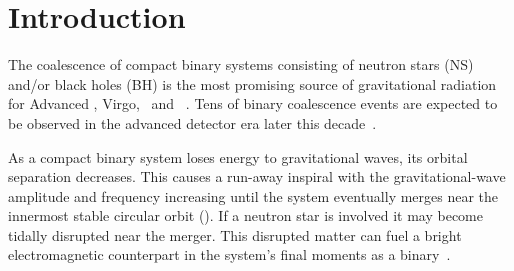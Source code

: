 \section{Introduction}
\label{sec:introduction}



The coalescence of compact binary systems consisting of neutron stars (NS)
and/or black holes (BH) is the most promising source of gravitational radiation
for Advanced \LIGO, Virgo, \GEO\ and \LCGT~\cite{ALIGOWeb, AVirgoWeb, GEOWeb,
LCGTWeb}.  Tens of binary coalescence events are expected to be observed in the
advanced detector era later this decade~\cite{Abadie:2010p10836}.

As a compact binary system loses energy to gravitational waves, its orbital
separation decreases. This causes a run-away inspiral with the
gravitational-wave amplitude and frequency increasing until the system
eventually merges near the innermost stable circular orbit (\ISCO).  If a
neutron star is involved it may become tidally disrupted near the merger.  This
disrupted matter can fuel a bright electromagnetic counterpart in the system's
final moments as a binary~\cite{shibata:2007}.

